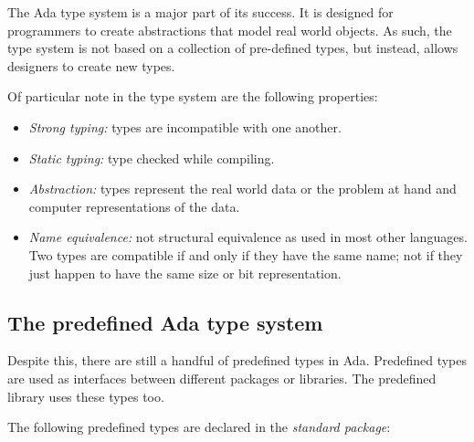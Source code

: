 The Ada type system is a major part of its success. It is designed for programmers to create abstractions that model real world objects. As such, the type system is not based on a collection of pre-defined types, but instead, allows designers to create new types.

Of particular note in the type system are the following properties:

\begin{itemize}
    
  \item \emph{Strong typing:} types are incompatible with one another.

  \item \emph{Static typing:} type checked while compiling.

  \item \emph{Abstraction:} types represent the real world data or the problem at hand and computer representations of the data.

  \item \emph{Name equivalence:} not structural equivalence as used in most other languages. Two types are compatible if and only if they have the same name; not if they just happen to have the same size or bit representation.

\end{itemize}



\subsection{The predefined Ada type system}

Despite this, there are still a handful of predefined types in Ada. Predefined types are used as interfaces between different packages or libraries. The predefined library uses these types too.

The following predefined types are declared in the \emph{standard package}:

